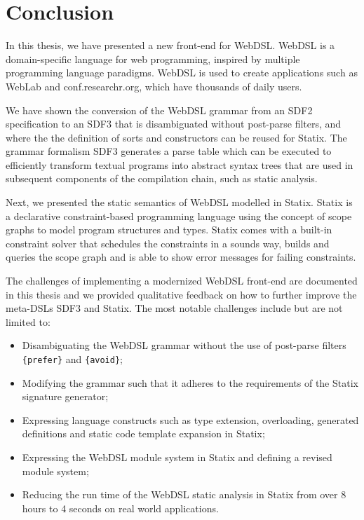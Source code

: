 
\chapter{\label{chap:conclusion}Conclusion}

  In this thesis, we have presented a new front-end for WebDSL. WebDSL is a domain-specific language for web programming, inspired by multiple programming language paradigms. WebDSL is used to create applications such as WebLab and conf.researchr.org, which have thousands of daily users.

  We have shown the conversion of the WebDSL grammar from an SDF2 specification to an SDF3 that is disambiguated without post-parse filters, and where the the definition of sorts and constructors can be reused for Statix. The grammar formalism SDF3 generates a parse table which can be executed to efficiently transform textual programs into abstract syntax trees that are used in subsequent components of the compilation chain, such as static analysis.

  Next, we presented the static semantics of WebDSL modelled in Statix. Statix is a declarative constraint-based programming language using the concept of scope graphs to model program structures and types. Statix comes with a built-in constraint solver that schedules the constraints in a sounds way, builds and queries the scope graph and is able to show error messages for failing constraints.

  The challenges of implementing a modernized WebDSL front-end are documented in this thesis and we provided qualitative feedback on how to further improve the meta-DSLs SDF3 and Statix. The most notable challenges include but are not limited to:
  
  \begin{itemize}
    \item Disambiguating the WebDSL grammar without the use of post-parse filters \texttt{\{prefer\}} and \texttt{\{avoid\}};
    \item Modifying the grammar such that it adheres to the requirements of the Statix signature generator;
    \item Expressing language constructs such as type extension, overloading, generated definitions and static code template expansion in Statix;
    \item Expressing the WebDSL module system in Statix and defining a revised module system;
    \item Reducing the run time of the WebDSL static analysis in Statix from over 8 hours to 4 seconds on real world applications.
  \end{itemize}

